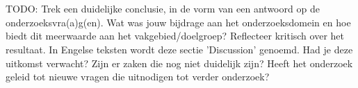 
\chapter{}%
\label{ch:conclusie}

TODO: Trek een duidelijke conclusie, in de vorm van een antwoord op de
onderzoeksvra(a)g(en). Wat was jouw bijdrage aan het onderzoeksdomein en
hoe biedt dit meerwaarde aan het vakgebied/doelgroep? 
Reflecteer kritisch over het resultaat. In Engelse teksten wordt deze sectie
'Discussion' genoemd. Had je deze uitkomst verwacht? Zijn er zaken die nog
niet duidelijk zijn?
Heeft het onderzoek geleid tot nieuwe vragen die uitnodigen tot verder 
onderzoek?

